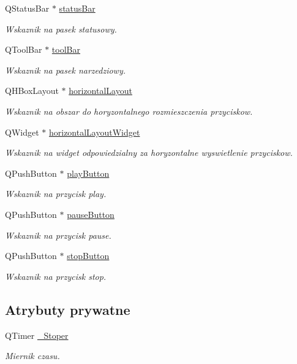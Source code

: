 \begin{DoxyCompactItemize}
Q\-Status\-Bar $\ast$ \hyperlink{class_okno_glowne_a40a10989bc6b318ac24e2457d7adb53b}{status\-Bar}
\begin{DoxyCompactList}\small\item\em Wskaznik na pasek statusowy. \end{DoxyCompactList}\item 
Q\-Tool\-Bar $\ast$ \hyperlink{class_okno_glowne_a6a37dd1f32605092fff7feac712bf429}{tool\-Bar}
\begin{DoxyCompactList}\small\item\em Wskaznik na pasek narzedziowy. \end{DoxyCompactList}\item 
Q\-H\-Box\-Layout $\ast$ \hyperlink{class_okno_glowne_aacb5ddb6d0eb560a47917cc1b457239a}{horizontal\-Layout}
\begin{DoxyCompactList}\small\item\em Wskaznik na obszar do horyzontalnego rozmieszczenia przyciskow. \end{DoxyCompactList}\item 
Q\-Widget $\ast$ \hyperlink{class_okno_glowne_a12ac2d00b9ca186176ccc710a928a723}{horizontal\-Layout\-Widget}
\begin{DoxyCompactList}\small\item\em Wskaznik na widget odpowiedzialny za horyzontalne wyswietlenie przyciskow. \end{DoxyCompactList}\item 
Q\-Push\-Button $\ast$ \hyperlink{class_okno_glowne_a50f936486c1bc3b3278823a8eb90841e}{play\-Button}
\begin{DoxyCompactList}\small\item\em Wskaznik na przycisk play. \end{DoxyCompactList}\item 
Q\-Push\-Button $\ast$ \hyperlink{class_okno_glowne_a0dde8df8a49b8f47f17f8e748fd15967}{pause\-Button}
\begin{DoxyCompactList}\small\item\em Wskaznik na przycisk pause. \end{DoxyCompactList}\item 
Q\-Push\-Button $\ast$ \hyperlink{class_okno_glowne_a3051d73dc0e0a27dc30ada43cc6b63c4}{stop\-Button}
\begin{DoxyCompactList}\small\item\em Wskaznik na przycisk stop. \end{DoxyCompactList}\end{DoxyCompactItemize}
\subsection*{Atrybuty prywatne}
\begin{DoxyCompactItemize}
\item 
Q\-Timer \hyperlink{class_okno_glowne_a5d047f90666212f58e69d11af3285d9b}{\-\_\-\-Stoper}
\begin{DoxyCompactList}\small\item\em Miernik czasu. \end{DoxyCompactList}\end{DoxyCompactItemize}



